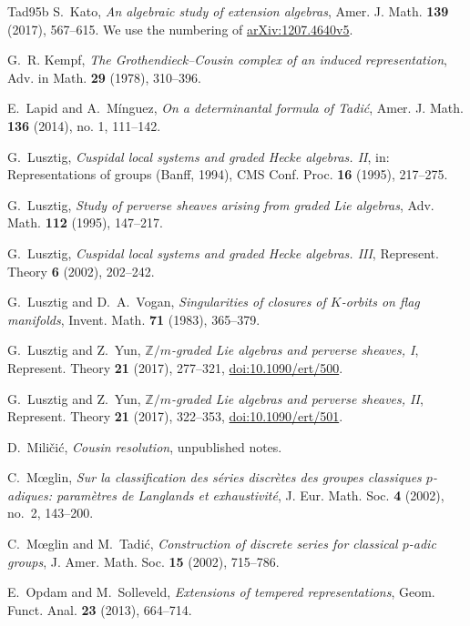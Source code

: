 \documentclass[a4paper,12pt,leqno]{amsart}
\theoremstyle{plain}
\theoremstyle{definition}
\begin{document}
\begin{thebibliography}{Tad95b}
 S.~Kato, \emph{An algebraic study of extension algebras}, Amer. J. Math.
\textbf{139} (2017), 567--615. We use the numbering of \href{https://arxiv.org/abs/1207.4640v5}{arXiv:1207.4640v5}.

 G.~R. Kempf, \emph{The Grothendieck--Cousin complex of an induced
representation}, Adv. in Math. \textbf{29} (1978), 310--396.

 E.~Lapid and A.~M\'inguez, \emph{On a determinantal formula of Tadi\'c}, Amer.
J. Math. \textbf{136} (2014), no. 1, 111--142.

 G.~Lusztig, \emph{Cuspidal local systems and graded Hecke algebras. II}, in:
Representations of groups (Banff, 1994), CMS Conf. Proc. \textbf{16} (1995), 217--275.

 G.~Lusztig, \emph{Study of perverse sheaves arising from graded Lie algebras},
Adv. Math. \textbf{112} (1995), 147--217.

 G.~Lusztig, \emph{Cuspidal local systems and graded Hecke algebras. III},
Represent. Theory \textbf{6} (2002), 202--242.

 G.~Lusztig and D.~A.~Vogan, \emph{Singularities of closures of $K$-orbits on flag
manifolds}, Invent. Math. \textbf{71} (1983), 365--379.

 G.~Lusztig and Z.~Yun, \emph{$\mathbb Z/m$-graded Lie algebras and perverse
sheaves, I}, Represent. Theory \textbf{21} (2017), 277--321, \href{https://doi.org/10.1090/ert/500}{doi:10.1090/ert/500}.

 G.~Lusztig and Z.~Yun, \emph{$\mathbb Z/m$-graded Lie algebras and perverse
sheaves, II}, Represent. Theory \textbf{21} (2017), 322--353, \href{https://doi.org/10.1090/ert/501}{doi:10.1090/ert/501}.

 D.~Mili\v{c}i\'c, \emph{Cousin resolution}, unpublished notes.

 C.~M\oe glin, \emph{Sur la classification des s\'eries discr\`etes des groupes
classiques $p$-adiques: param\`etres de Langlands et exhaustivit\'e}, J. Eur. Math. Soc. \textbf{4}
(2002), no.~2, 143--200.

 C.~M\oe glin and M.~Tadi\'c, \emph{Construction of discrete series for
classical $p$-adic groups}, J. Amer. Math. Soc. \textbf{15} (2002), 715--786.

 E.~Opdam and M.~Solleveld, \emph{Extensions of tempered representations}, Geom.
Funct. Anal. \textbf{23} (2013), 664--714.


\end{thebibliography}
\end{document}
